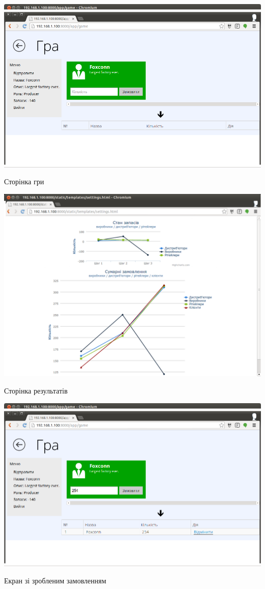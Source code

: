 \begin{stdfigure}
    \includegraphics[width=7in]{images/screen/game_screen.png}
    \caption{Сторінка гри}
    \label{fig:game_screen}
\end{stdfigure}   
\begin{stdfigure}
    \includegraphics[width=7in]{images/screen/plot_screen.png}
    \caption{Сторінка результатів}
    \label{fig:plot_screen}
\end{stdfigure}   
\begin{stdfigure}
    \includegraphics[width=7in]{images/screen/step_screen.png}
    \caption{Екран зі зробленим замовленням}
    \label{fig:step_screen}
\end{stdfigure}   
